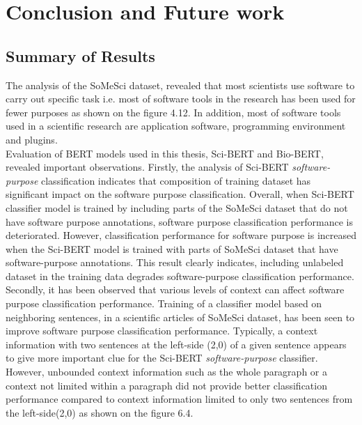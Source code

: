 \chapter{Conclusion and Future work}
\label{ch:chapter07}
 
%
%

\section{Summary of Results }
\label{sec:chapter06:summary}

The analysis of the SoMeSci dataset, revealed that most scientists use software to carry out specific task i.e. most of software tools in the research has been used for fewer purposes as shown on the figure 4.12. In addition, most of software tools used in a scientific research are application software, programming environment and plugins. \\  

Evaluation of \ac{BERT} models used in this thesis, \ac{Sci-BERT} and \ac{Bio-BERT}, revealed important observations. Firstly, the analysis of Sci-BERT \emph{software-purpose} classification indicates that composition of training dataset has significant impact on the software purpose classification. Overall, when Sci-BERT classifier model is trained by including parts of the SoMeSci dataset that do not have software purpose annotations, software purpose classification performance is deteriorated. However, classification performance for software purpose is increased when the Sci-BERT model is trained with parts of \ac{SoMeSci} dataset that have software-purpose annotations. This result clearly indicates, including unlabeled dataset in the training data degrades software-purpose classification performance.  \\

Secondly, it has been observed that various levels of context can affect software purpose classification performance. Training of a classifier model based on neighboring sentences, in a scientific articles of SoMeSci dataset, has been seen to improve software purpose classification performance. Typically, a context information with two sentences at the left-side (2,0) of a given sentence appears to give more important clue for the \ac{Sci-BERT} \emph{software-purpose} classifier. However, unbounded context information such as the whole paragraph or a context not limited within a paragraph did not provide better classification performance compared to context information limited to only two sentences from the left-side(2,0) as shown on the figure 6.4. \\



